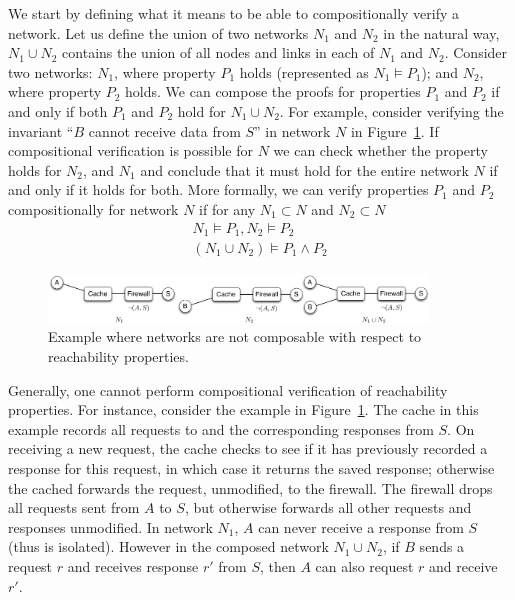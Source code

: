 \cbstart
We start by defining what it means to be able to compositionally verify a network. Let us define the union of two networks $N_1$ and $N_2$ in the natural way, \ie $N_1\cup N_2$ contains the union of all nodes and links in each of $N_1$ and $N_2$. Consider two networks: $N_1$, where property $P_1$ holds (represented as $N_1\models P_1$); and $N_2$, where property $P_2$ holds. We can compose the proofs for properties $P_1$ and $P_2$ if and only if  both $P_1$ and $P_2$ hold for $N_1 \cup N_2$. For example, consider verifying the invariant ``$B$ cannot receive data from $S$'' in network $N$ in Figure~\ref{fig:compose_fail}. If compositional verification is possible for $N$ we can check whether the property holds for $N_2$, and $N_1$ and conclude that it must hold for the entire network $N$ if and only if it holds for both. More formally, we can verify properties $P_1$ and $P_2$ compositionally for network $N$ if for any $N_1 \subset N$ and $N_2\subset N$
\begin{align*}
N_1 \models P_1,  N_2\models P_2\\
\hline
(N_1 \cup N_2) \models P_1\land P_2
\end{align*}
\cbend


\begin{figure}[t]
\centering
\includegraphics[width=0.9\textwidth]{figures/rono_example.pdf}
\caption{Example where networks are not composable with respect to reachability properties.}
\label{fig:compose_fail}
\vspace{-0.15in}
\end{figure}

Generally, one cannot perform compositional verification of reachability properties. For instance,
consider the example in Figure~\ref{fig:compose_fail}. The cache in this example records all requests to and the corresponding responses from $S$.
On receiving a new request,  the cache checks to see if it has previously recorded a response for this request, in which case it returns the saved response;
otherwise the cached forwards the request, unmodified, to the firewall. The firewall drops all requests sent from $A$ to $S$, but otherwise forwards all other requests and responses unmodified. In network $N_1$, $A$ can never receive a response from $S$ (thus is isolated). However in the composed network $N_1\cup N_2$, if $B$ sends a request $r$ and receives response $r'$ from $S$, then $A$ can also request $r$ and receive $r'$.

